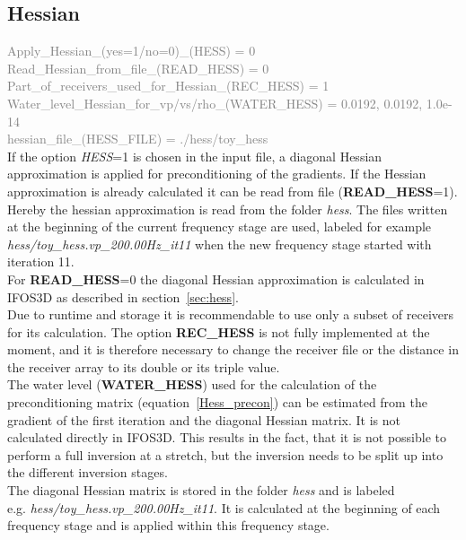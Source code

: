 \subsection{Hessian}
\textcolor {Gray}{Apply\_Hessian\_(yes=1/no=0)\_(HESS) = 0\\
Read\_Hessian\_from\_file\_(READ\_HESS) = 0\\
Part\_of\_receivers\_used\_for\_Hessian\_(REC\_HESS) = 1\\ 
Water\_level\_Hessian\_for\_vp/vs/rho\_(WATER\_HESS) = 0.0192, 0.0192, 1.0e-14\\
hessian\_file\_(HESS\_FILE) = ./hess/toy\_hess }\vspace{0.1cm}\\
If the option \textit{HESS}=1 is chosen in the input file, a diagonal Hessian approximation is applied for preconditioning of the gradients. If the Hessian approximation is already calculated it can be read from file (\textbf{READ\_HESS}=1). Hereby the hessian approximation is read from the folder \textit{hess}. The files written at the beginning of the current frequency stage are used, labeled for example \textit{hess/toy\_hess.vp\_200.00Hz\_it11} when the new frequency stage started with iteration 11. \\
For \textbf{READ\_HESS}=0 the diagonal Hessian approximation is calculated in IFOS3D as described in section~\ref{sec:hess}.\\
Due to runtime and storage it is recommendable to use only a subset of receivers for its calculation. The option \textbf{REC\_HESS} is not fully implemented at the moment, and it is therefore necessary to change the receiver file or the distance in the receiver array to its double or its triple value. \\
The water level (\textbf{WATER\_HESS}) used for the calculation of the preconditioning matrix (equation~\ref{Hess_precon}) can be estimated from the gradient of the first iteration and the diagonal Hessian matrix. It is not calculated directly in IFOS3D. This results in the fact, that it is not possible to perform a full inversion at a stretch, but the inversion needs to be split up into the different inversion stages.\\
The diagonal Hessian matrix is stored in the folder \textit{hess} and is labeled \\e.g. \textit{hess/toy\_hess.vp\_200.00Hz\_it11}. It is calculated at the beginning of each frequency stage and is applied within this frequency stage.
